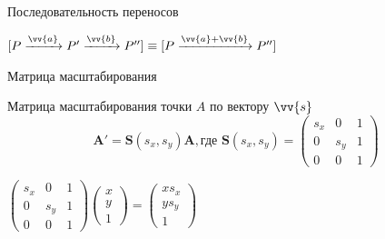 \documentclass[10pt]{beamer}
\begin{document}
\begin{frame} {Последовательность переносов}
{			$[P \xrightarrow{\vv{a}} P' \xrightarrow{\vv{b}} P''] \equiv [P \xrightarrow{\vv{a}+\vv{b}} P'']$
			
		}
		

		
  \end{frame}



\begin{frame}{Матрица масштабирования}
	\begin{block}{Матрица масштабирования точки $A$ по вектору $\vv{s}$ }
		$$
			\textbf{A}' =\textbf{S}(s_x,s_y) \textbf{A}, \text{где } \textbf{S}(s_x,s_y) =
			\begin{pmatrix}
				s_x&0&1\\
				0&s_y&1\\
				0&0&1
			\end{pmatrix} 
		$$
	\end{block}
	$
		\begin{pmatrix}
			s_x&0&1\\
			0&s_y&1\\
			0&0&1
		\end{pmatrix}
		\begin{pmatrix}
			x\\
			y\\
			1
		\end{pmatrix}
		=
		\begin{pmatrix}
			xs_x\\
			ys_y\\
			1
		\end{pmatrix}
	$
\end{frame}
\end{document}
